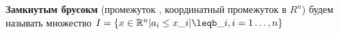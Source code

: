 

	\textbf{Замкнутым брусокм } (промежуток , координатный промежуток в $R^{n}$) будем называть множество $I= \{x\in \RR^{n} | a_i\leq x\_i|\leqb\_i, i=1\dots,n\}$


